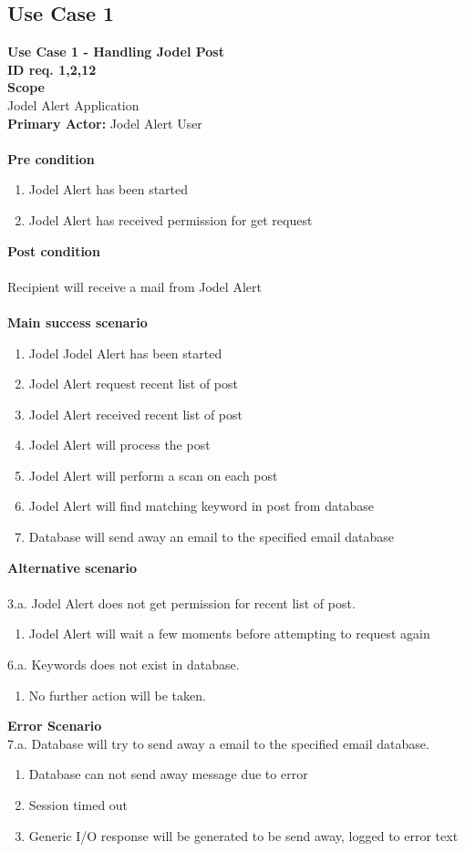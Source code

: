 \documentclass[a4paper,12pt]{article}
\begin{document}
\subsection{Use Case 1}
\textbf{Use Case 1 - Handling Jodel Post}\\
\textbf{ID req. 1,2,12}\\
\textbf{Scope}\\
Jodel Alert Application\\
\textbf{Primary Actor:}
Jodel Alert User\\\\
\textbf{Pre condition}
\begin{enumerate}
	\item Jodel Alert has been started
	\item Jodel Alert has received permission for get request
\end{enumerate}
\textbf{Post condition}\\\\
Recipient will receive a mail from Jodel Alert\\\\
\textbf{Main success scenario}
\begin{enumerate}
	\item Jodel Jodel Alert has been started
	\item Jodel Alert request recent list of post
	\item Jodel Alert received recent list of post
	\item Jodel Alert will process the post
	\item Jodel Alert will perform a scan on each post
	\item Jodel Alert will find matching keyword in post from database
	\item Database will send away an email to the specified email database 
	
\end{enumerate}
\textbf{Alternative scenario}\\\\
3.a. Jodel Alert does not get permission for recent list of post.
\begin{enumerate}
	\item Jodel Alert will wait a few moments before attempting to request again
\end{enumerate}
6.a. Keywords does not exist in database.
\begin{enumerate}
	\item No further action will be taken.
\end{enumerate}
\textbf{Error Scenario}\\
7.a. Database will try to send away a email to the specified email database.\\
\begin{enumerate}
	\item Database can not send away message due to error
	\item Session timed out
	\item Generic I/O response will be generated to be send away, logged to error text
\end{enumerate}
\end{document}
